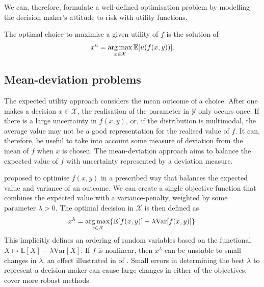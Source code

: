 \documentclass[main.tex]{subfiles}
\begin{document}
We can, therefore, formulate a well-defined optimisation problem by
modelling the decision maker's attitude to risk with utility functions.

\begin{problem}
  The optimal choice to maximise a given utility of $f$ is the
  solution of
  \begin{align}
    x^u=\operatorname*{arg\,max}_{x\in\mathcal{X}} \mathbb{E}[u(f(x,y))].
  \end{align}
\end{problem}

\subsection{Mean-deviation problems}
The expected utility approach considers the mean outcome of a choice.
After one makes a decision $x\in\mathcal{X}$, the realisation of the
parameter in $\mathcal{Y}$ only occurs once. If there is a large
uncertainty in $f(x,y)$, or, if the distribution is multimodal, the
average value may not be a good representation for the realised value of $f$.
It can, therefore, be useful to take into account some measure of
deviation from the mean of $f$ when $x$ is chosen.
The mean-deviation approach aims to balance the expected value of $f$
with uncertainty represented by a deviation measure.

\begin{example}
  \citet{markowitz1952portfolio} proposed to optimise $f(x,y)$ in
  a prescribed way that
  balances the expected value and variance of an outcome.
  We can create a single objective function that combines
  the expected value with a variance-penalty, weighted by some
  parameter $\lambda>0$. The optimal decision in $\mathcal{X}$ is then
  defined as
  \begin{equation}\label{eq:mean_dev_weighted}
    x^{\lambda}=\operatorname*{arg\,max}_{x\in\mathcal{X}}\{\mathbb{E}[f(x,y)]-\lambda
    \mbox{Var}[f(x,y)]\}.
  \end{equation}
  This implicitly defines an ordering of random variables based on
  the functional $X\mapsto \mathbb{E}[X]-\lambda \mbox{Var}[X]$.
  If $f$ is nonlinear, then $x^{\lambda}$ can be unstable to
  small changes in $\lambda$, an effect illustrated in
   of .
  Small errors in determining the best
  $\lambda$ to represent a decision maker can cause large changes in
  either of the objectives. \citet{marler2004survey} cover
  more robust methods.
\end{example}
\end{document}
